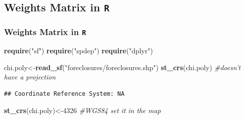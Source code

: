 \documentclass[
  shownotes,
  xcolor={svgnames},
  hyperref={colorlinks,citecolor=DarkBlue,linkcolor=DarkRed,urlcolor=DarkBlue}
   , aspectratio=169]{beamer}
\newenvironment{Shaded}{\begin{snugshade}}{\end{snugshade}}
\newcommand{\CommentTok}[1]{\textcolor[rgb]{0.56,0.35,0.01}{\textit{#1}}}
\newcommand{\DecValTok}[1]{\textcolor[rgb]{0.00,0.00,0.81}{#1}}
\newcommand{\KeywordTok}[1]{\textcolor[rgb]{0.13,0.29,0.53}{\textbf{#1}}}
\newcommand{\NormalTok}[1]{#1}
\newcommand{\StringTok}[1]{\textcolor[rgb]{0.31,0.60,0.02}{#1}}
\begin{document}
\subsection{Weights Matrix in \texttt{R}}
\begin{frame}[fragile]
\frametitle{Weights Matrix in \texttt{R}}


\begin{scriptsize}
\begin{Shaded}
\begin{Highlighting}[]
\KeywordTok{require}\NormalTok{(}\StringTok{"sf"}\NormalTok{)}
\KeywordTok{require}\NormalTok{(}\StringTok{"spdep"}\NormalTok{)}
\KeywordTok{require}\NormalTok{(}\StringTok{"dplyr"}\NormalTok{)}
\end{Highlighting}
\end{Shaded}

\begin{Shaded}
\begin{Highlighting}[]
\NormalTok{chi.poly\textless{}{-}}\KeywordTok{read\_sf}\NormalTok{(}\StringTok{"foreclosures/foreclosures.shp"}\NormalTok{)}
\KeywordTok{st\_crs}\NormalTok{(chi.poly) }\CommentTok{\#doesn't have a projection}
\end{Highlighting}
\end{Shaded}

\end{scriptsize}

\begin{verbatim}
## Coordinate Reference System: NA
\end{verbatim}

\begin{scriptsize}
\begin{Shaded}
\begin{Highlighting}[]
\KeywordTok{st\_crs}\NormalTok{(chi.poly)\textless{}{-}}\DecValTok{4326} \CommentTok{\#WGS84 set it in the map}
\end{Highlighting}
\end{Shaded}
\end{scriptsize}

\end{frame}
\end{document}
